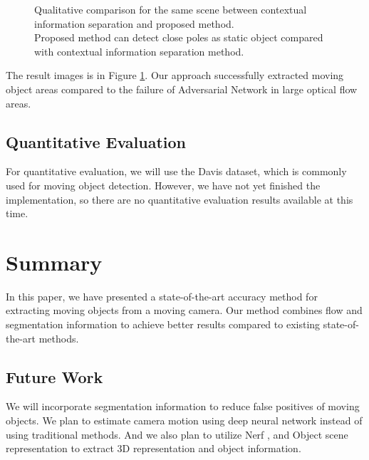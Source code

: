 \documentclass[10pt, twocolumn]{article}
\begin{document}
\begin{figure}[ht]
  \caption{Qualitative comparison for the same scene between contextual information separation and proposed method.\\
  Proposed method can detect close poles as static object compared with contextual information separation method.}
  \label{fig:comparison}
\end{figure}

The result images is in Figure \ref{fig:comparison}.
Our approach successfully extracted moving object areas compared to the failure of Adversarial Network in large optical flow areas.


\subsection{Quantitative Evaluation}
For quantitative evaluation, we will use the Davis dataset, which is commonly used for moving object detection.
However, we have not yet finished the implementation, so there are no quantitative evaluation results available at this time.


\section{Summary}
In this paper, we have presented a state-of-the-art accuracy method for extracting moving objects from a moving camera.
Our method combines flow and segmentation information to achieve better results compared to existing state-of-the-art methods.

\subsection{Future Work}
We will incorporate segmentation information to reduce false positives of moving objects.
We plan to estimate camera motion using deep neural network instead of using traditional methods.
And we also plan to utilize Nerf \cite{mildenhall2020nerf}, and Object scene representation to extract 3D representation and object information.




\end{document}

